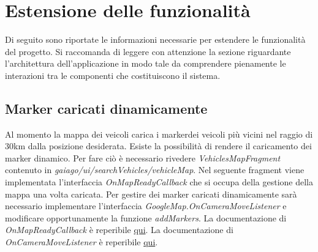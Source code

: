 \section{Estensione delle funzionalità}
Di seguito sono riportate le informazioni necessarie per estendere le funzionalità del progetto. Si raccomanda di leggere con attenzione la sezione riguardante l'architettura dell'applicazione in modo tale da comprendere pienamente le interazioni tra le componenti che costituiscono il sistema.
\subsection{Marker caricati dinamicamente}
Al momento la mappa dei veicoli carica i marker\glosp dei veicoli più vicini nel raggio di 30km dalla posizione desiderata. Esiste la possibilità di rendere il caricamento dei marker dinamico. Per fare ciò è necessario rivedere \textit{VehiclesMapFragment} contenuto in \textit{gaiago/ui/searchVehicles/vehicleMap}.
Nel seguente fragment viene implementata l'interfaccia \textit{OnMapReadyCallback} che si occupa della gestione della mappa una volta caricata. Per gestire dei marker caricati dinamicamente sarà necessario implementare l'interfaccia \textit{GoogleMap.OnCameraMoveListener} e modificare opportunamente la funzione \textit{addMarkers}.
\newline
La documentazione di \textit{OnMapReadyCallback} è reperibile \href{https://developers.google.com/android/reference/com/google/android/gms/maps/OnMapReadyCallback}{qui}.
\newline
La documentazione di \textit{OnCameraMoveListener} è reperibile
\href{https://developers.google.com/android/reference/com/google/android/gms/maps/GoogleMap.OnCameraMoveListener}{qui}.
